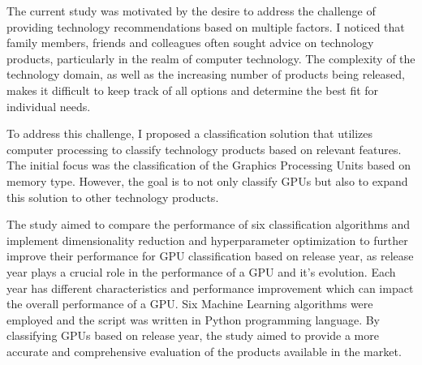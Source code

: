 \documentclass[conference,onecolumn]{IEEEtran}
\begin{document}
The current study was motivated by the desire to address the challenge of providing technology recommendations based on multiple factors. I noticed that family members, friends and colleagues often sought advice on technology products, particularly in the realm of computer technology. The complexity of the technology domain, as well as the increasing number of products being released, makes it difficult to keep track of all options and determine the best fit for individual needs.

To address this challenge, I proposed a classification solution that utilizes computer processing to classify technology products based on relevant features. The initial focus was the classification of the Graphics Processing Units based on memory type. However, the goal is to not only classify GPUs but also to expand this solution to other technology products.

The study aimed to compare the performance of six classification algorithms and implement dimensionality reduction and hyperparameter optimization to further improve their performance for GPU classification based on release year, as release year plays a crucial role in the performance of a GPU and it's evolution. Each year has different characteristics and performance improvement which can impact the overall performance of a GPU. Six Machine Learning algorithms were employed and the script was written in Python programming language. By classifying GPUs based on release year, the study aimed to provide a more accurate and comprehensive evaluation of the products available in the market.
\end{document}
